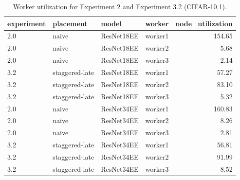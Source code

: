 \begin{table}
\centering
\caption{Worker utilization for Experiment 2 and Experiment 3.2 (CIFAR-10.1).}
\label{tab:exp2-best-exp3-worker-utilization-cifar10-1}
\begin{tabular}{llllr}
\toprule
experiment &      placement &      model &  worker &  node\_utilization \\
\midrule
       2.0 &          naive & ResNet18EE & worker1 &            154.65 \\
       2.0 &          naive & ResNet18EE & worker2 &              5.68 \\
       2.0 &          naive & ResNet18EE & worker3 &              2.14 \\
       3.2 & staggered-late & ResNet18EE & worker1 &             57.27 \\
       3.2 & staggered-late & ResNet18EE & worker2 &             83.10 \\
       3.2 & staggered-late & ResNet18EE & worker3 &              5.32 \\
       2.0 &          naive & ResNet34EE & worker1 &            160.83 \\
       2.0 &          naive & ResNet34EE & worker2 &              8.26 \\
       2.0 &          naive & ResNet34EE & worker3 &              2.81 \\
       3.2 & staggered-late & ResNet34EE & worker1 &             56.81 \\
       3.2 & staggered-late & ResNet34EE & worker2 &             91.99 \\
       3.2 & staggered-late & ResNet34EE & worker3 &              8.52 \\
\bottomrule
\end{tabular}
\end{table}
